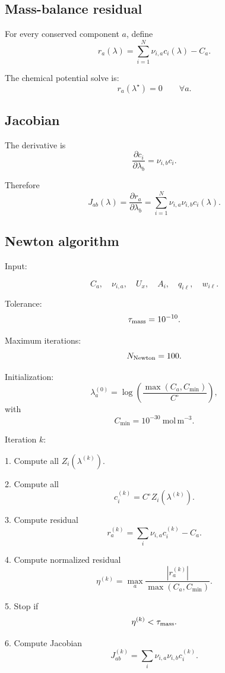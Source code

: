 \documentclass[11pt]{article}
\begin{document}
  \subsection{Mass-balance residual}

  For every conserved component \(a\), define
  \[
  r_a(\lambda)
  =
  \sum_{i=1}^N\nu_{i,a}c_i(\lambda)-C_a.
  \]

  The chemical potential solve is:
  \[
  r_a(\lambda^\star)=0
  \qquad
  \forall a.
  \]

  \subsection{Jacobian}

  The derivative is
  \[
  \frac{\partial c_i}{\partial\lambda_b}
  =
  \nu_{i,b}c_i.
  \]

  Therefore
  \[
  J_{ab}(\lambda)
  =
  \frac{\partial r_a}{\partial\lambda_b}
  =
  \sum_{i=1}^N\nu_{i,a}\nu_{i,b}c_i(\lambda).
  \]

  \subsection{Newton algorithm}

  Input:

  \[
  C_a,\quad \nu_{i,a},\quad U_x,\quad A_i,\quad q_{i\ell},\quad w_{i\ell}.
  \]

  Tolerance:
  \[
  \tau_{\rm mass}=10^{-10}.
  \]

  Maximum iterations:
  \[
  N_{\rm Newton}=100.
  \]

  Initialization:
  \[
  \lambda_a^{(0)}
  =
  \log
  \left(
  \frac{\max(C_a,C_{\min})}{C^\circ}
  \right),
  \]
  with
  \[
  C_{\min}=10^{-30}\ \mathrm{mol\,m^{-3}}.
  \]

  Iteration \(k\):

  1. Compute all \(Z_i(\lambda^{(k)})\).

  2. Compute all
  \[
  c_i^{(k)}=C^\circ Z_i(\lambda^{(k)}).
  \]

  3. Compute residual
  \[
  r_a^{(k)}
  =
  \sum_i\nu_{i,a}c_i^{(k)}-C_a.
  \]

  4. Compute normalized residual
  \[
  \eta^{(k)}
  =
  \max_a
  \frac{|r_a^{(k)}|}
  {\max(C_a,C_{\min})}.
  \]

  5. Stop if
  \[
  \eta^{(k)}<\tau_{\rm mass}.
  \]

  6. Compute Jacobian
  \[
  J_{ab}^{(k)}
  =
  \sum_i\nu_{i,a}\nu_{i,b}c_i^{(k)}.
  \]
\end{document}
